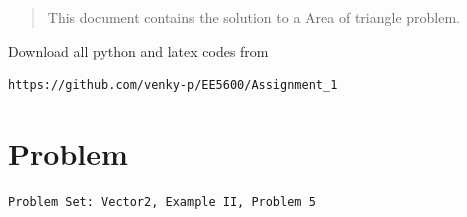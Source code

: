 \documentclass[journal,12pt,twocolumn]{IEEEtran}
\begin{document}
\maketitle

\renewcommand{\thefigure}{\theenumi}
\renewcommand{\thetable}{\theenumi}

\begin{abstract}
This document contains the solution to a Area of triangle problem.
\end{abstract}
%
Download all python and latex codes from 
%
\begin{lstlisting}
https://github.com/venky-p/EE5600/Assignment_1
\end{lstlisting}
%
\section{Problem}
\begin{lstlisting}
Problem Set: Vector2, Example II, Problem 5
\end{lstlisting}
\renewcommand{\theequation}{\theenumi}
\end{document}
